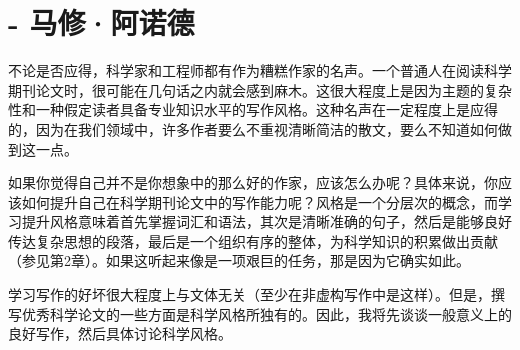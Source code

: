 \section*{- 马修·阿诺德}
不论是否应得，科学家和工程师都有作为糟糕作家的名声。一个普通人在阅读科学期刊论文时，很可能在几句话之内就会感到麻木。这很大程度上是因为主题的复杂性和一种假定读者具备专业知识水平的写作风格。这种名声在一定程度上是应得的，因为在我们领域中，许多作者要么不重视清晰简洁的散文，要么不知道如何做到这一点。

如果你觉得自己并不是你想象中的那么好的作家，应该怎么办呢？具体来说，你应该如何提升自己在科学期刊论文中的写作能力呢？风格是一个分层次的概念，而学习提升风格意味着首先掌握词汇和语法，其次是清晰准确的句子，然后是能够良好传达复杂思想的段落，最后是一个组织有序的整体，为科学知识的积累做出贡献（参见第2章）。如果这听起来像是一项艰巨的任务，那是因为它确实如此。

学习写作的好坏很大程度上与文体无关（至少在非虚构写作中是这样）。但是，撰写优秀科学论文的一些方面是科学风格所独有的。因此，我将先谈谈一般意义上的良好写作，然后具体讨论科学风格。

